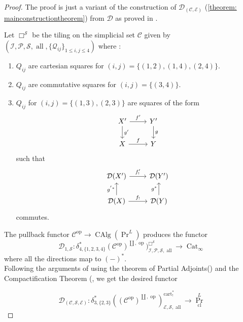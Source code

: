 \documentclass[14pt]{article}
\theoremstyle{definition}
\newcommand{\E}{\mathcal{E}}
\newcommand{\D}{\mathcal{D}}
\renewcommand{\P}{\mathcal{P}}
\newcommand{\op}[1]{\operatorname{#1}}
\renewcommand{\S}{\mathcal{S}}
\newcommand{\dd}{\delta}
\newcommand{\I}{\mathscr{I}}
\newcommand{\Ca}{\mathcal{C}}
\numberwithin{subsection}{section}
\begin{document}
\begin{proof}
  The proof is just a variant of the construction of $\D_{(\Ca,\E)}$ (\cref{theorem: mainconstructiontheorem}) from $\D$ as proved in \cite[Theorem 5.2.3]{chowdhury2025sixfunctorformalismsiiiconstruction}.  

Let $\op{\Box^{\S}}$ be the tiling on the simplicial set $\Ca$ given by $(\I,\P,\S,\op{all},\{ \mathcal{Q}_{ij} \}_{1\le i,j \le 4})$ where
:
\begin{enumerate}
    \item $Q_{ij}$ are cartesian squares for $(i,j)=\{(1,2),(1,4),(2,4)\}$.
    \item $Q_{ij}$ are commutative squares for $(i,j)=\{(3,4)\}$.
    \item $Q_{ij}$ for $(i,j)=\{(1,3),(2,3)\}$ are squares of the form 
    \begin{equation}
    \begin{tikzcd}
        X' \arrow[r,"f'"] \arrow[d,"g'"] & Y'\arrow[d,"g"] \\
        X \arrow[r,"f"] & Y
        \end{tikzcd}
    \end{equation}
    such that 
    \begin{equation}
    \begin{tikzcd}
        \D(X') \arrow[r,"f'_!"] & \D(Y') \\
        \D(X) \arrow[u,"g^{'*}"] \arrow[r,"f_!"] & \D(Y)\arrow[u,"g^*"]
        \end{tikzcd}
    \end{equation}
    commutes.
\end{enumerate}

The pullback functor $\Ca^{\op{op}} \to \op{CAlg}(\op{Pr}^L)$ produces the functor 
\begin{equation}
   \D_{1,\S}: \dd^*_{4,\{1,2,3,4\}}(\Ca^{\op{op}})^{\coprod,\op{op}})^{\Box^{\S}}_{\I,\P,\S,\op{all}} \to \op{Cat}_{\infty}
\end{equation}
where all the directions map to $(-)^*$.\\
Following the arguments of \cite[Theorem 5.2.3]{chowdhury2025sixfunctorformalismsiiiconstruction} using the theorem of Partial Adjoints(\cite[Theorem 3.2.1]{chowdhury2025sixfunctorformalismsiiiconstruction}) and the Compactification Theorem (\cite[Theorem 2.2.4]{chowdhury2025sixfunctorformalismsii}, we get the desired functor

\begin{equation}
    \D_{(\Ca,\S,\E)} : \dd^*_{3,\{2,3\}}((\Ca^{\op{op}})^{\coprod,\op{op}})^{\op{cart}^*_!}_{\E,\S,\op{all}} \to \op{Pr}^L_{\op{cl}}
\end{equation}

\end{proof}
\end{document}
